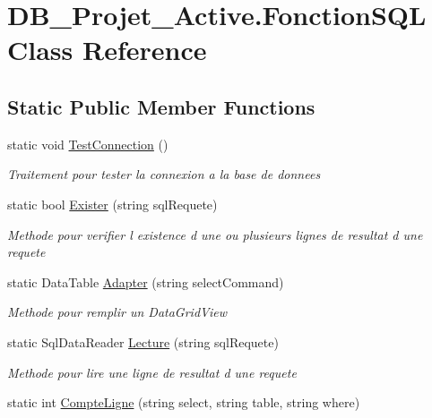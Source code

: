 \hypertarget{class_d_b___projet___active_1_1_fonction_s_q_l}{}\section{D\+B\+\_\+\+Projet\+\_\+\+Active.\+Fonction\+S\+QL Class Reference}
\label{class_d_b___projet___active_1_1_fonction_s_q_l}
\subsection*{Static Public Member Functions}
\begin{DoxyCompactItemize}
\item 
static void \mbox{\hyperlink{class_d_b___projet___active_1_1_fonction_s_q_l_af4ac902eb2180f5eebb7e81fd20978ba}{Test\+Connection}} ()
\begin{DoxyCompactList}\small\item\em Traitement pour tester la connexion a la base de donnees \end{DoxyCompactList}\item 
static bool \mbox{\hyperlink{class_d_b___projet___active_1_1_fonction_s_q_l_a4246965586e2bc7669e0b1939d843987}{Exister}} (string sql\+Requete)
\begin{DoxyCompactList}\small\item\em Methode pour verifier l existence d une ou plusieurs lignes de resultat d une requete \end{DoxyCompactList}\item 
static Data\+Table \mbox{\hyperlink{class_d_b___projet___active_1_1_fonction_s_q_l_a66b653f2a7d59d04cac5946751d79d0a}{Adapter}} (string select\+Command)
\begin{DoxyCompactList}\small\item\em Methode pour remplir un Data\+Grid\+View \end{DoxyCompactList}\item 
static Sql\+Data\+Reader \mbox{\hyperlink{class_d_b___projet___active_1_1_fonction_s_q_l_a932d9adcf7a102f4580dec18dd3f6966}{Lecture}} (string sql\+Requete)
\begin{DoxyCompactList}\small\item\em Methode pour lire une ligne de resultat d une requete \end{DoxyCompactList}\item 
static int \mbox{\hyperlink{class_d_b___projet___active_1_1_fonction_s_q_l_a717706aa5be603169ecc0a6098477cb6}{Compte\+Ligne}} (string select, string table, string where)

\end{DoxyCompactItemize}
